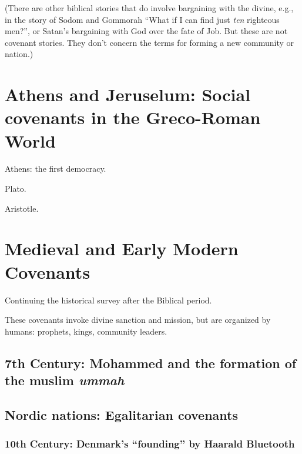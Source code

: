 \documentclass[
]{book}
\begin{document}
(There are other biblical stories that do involve bargaining with the divine, e.g., in the story of Sodom and Gommorah ``What if I can find just \emph{ten} righteous men?'', or Satan's bargaining with God over the fate of Job. But these are not covenant stories. They don't concern the terms for forming a new community or nation.)

\hypertarget{athens-and-jeruselum-social-covenants-in-the-greco-roman-world}{%
\chapter{Athens and Jeruselum: Social covenants in the Greco-Roman World}\label{athens-and-jeruselum-social-covenants-in-the-greco-roman-world}}

Athens: the first democracy.

Plato.

Aristotle.

\hypertarget{medieval-and-early-modern-covenants}{%
\chapter{Medieval and Early Modern Covenants}\label{medieval-and-early-modern-covenants}}

Continuing the historical survey after the Biblical period.

These covenants invoke divine sanction and mission, but are organized by humans: prophets, kings, community leaders.

\hypertarget{th-century-mohammed-and-the-formation-of-the-muslim-ummah}{%
\section{\texorpdfstring{7th Century: Mohammed and the formation of the muslim \emph{ummah}}{7th Century: Mohammed and the formation of the muslim ummah}}\label{th-century-mohammed-and-the-formation-of-the-muslim-ummah}}

\hypertarget{nordic-nations-egalitarian-covenants}{%
\section{Nordic nations: Egalitarian covenants}\label{nordic-nations-egalitarian-covenants}}

\hypertarget{th-century-denmarks-founding-by-haarald-bluetooth}{%
\subsection{10th Century: Denmark's ``founding'' by Haarald Bluetooth}\label{th-century-denmarks-founding-by-haarald-bluetooth}}
\end{document}

